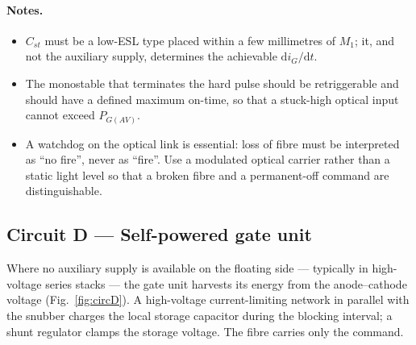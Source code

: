 \documentclass[11pt,a4paper]{article}
\begin{document}
\paragraph{Notes.}
\begin{itemize}
  \item $C_{st}$ must be a low-ESL type placed within a few millimetres of $M_1$;
        it, and not the auxiliary supply, determines the achievable
        $\mathrm{d}i_G/\mathrm{d}t$.
  \item The monostable that terminates the hard pulse should be retriggerable and
        should have a defined maximum on-time, so that a stuck-high optical input
        cannot exceed $P_{G(AV)}$.
  \item A watchdog on the optical link is essential: loss of fibre must be
        interpreted as ``no fire'', never as ``fire''. Use a modulated optical
        carrier rather than a static light level so that a broken fibre and a
        permanent-off command are distinguishable.
\end{itemize}

\subsection{Circuit D --- Self-powered gate unit}

Where no auxiliary supply is available on the floating side --- typically in
high-voltage series stacks --- the gate unit harvests its energy from the
anode--cathode voltage (Fig.~\ref{fig:circD}). A high-voltage current-limiting
network in parallel with the snubber charges the local storage capacitor during the
blocking interval; a shunt regulator clamps the storage voltage. The fibre carries
only the command.
\end{document}
